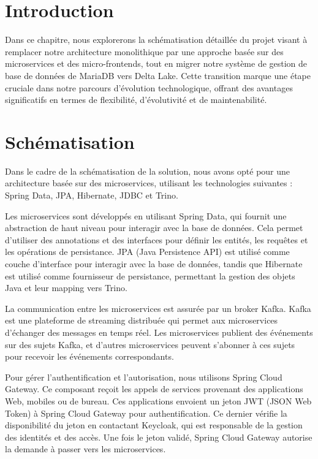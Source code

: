 \section*{Introduction}

Dans ce chapitre, nous explorerons la schématisation détaillée du projet visant à remplacer notre architecture monolithique par une approche basée sur des microservices et des micro-frontends, tout en migrer notre système de gestion de base de données de MariaDB vers Delta Lake. Cette transition marque une étape cruciale dans notre parcours d'évolution technologique, offrant des avantages significatifs en termes de flexibilité, d'évolutivité et de maintenabilité.

\section{Schématisation}

Dans le cadre de la schématisation de la solution, nous avons opté pour une architecture basée sur des microservices, utilisant les technologies suivantes : Spring Data, JPA, Hibernate, JDBC et Trino.

Les microservices sont développés en utilisant Spring Data, qui fournit une abstraction de haut niveau pour interagir avec la base de données. Cela permet d'utiliser des annotations et des interfaces pour définir les entités, les requêtes et les opérations de persistance. JPA (Java Persistence API) est utilisé comme couche d'interface pour interagir avec la base de données, tandis que Hibernate est utilisé comme fournisseur de persistance, permettant la gestion des objets Java et leur mapping vers Trino.

La communication entre les microservices est assurée par un broker Kafka. Kafka est une plateforme de streaming distribuée qui permet aux microservices d'échanger des messages en temps réel. Les microservices publient des événements sur des sujets Kafka, et d'autres microservices peuvent s'abonner à ces sujets pour recevoir les événements correspondants.

Pour gérer l'authentification et l'autorisation, nous utilisons Spring Cloud Gateway. Ce composant reçoit les appels de services provenant des applications Web, mobiles ou de bureau. Ces applications envoient un jeton JWT (JSON Web Token) à Spring Cloud Gateway pour authentification. Ce dernier vérifie la disponibilité du jeton en contactant Keycloak, qui est responsable de la gestion des identités et des accès. Une fois le jeton validé, Spring Cloud Gateway autorise la demande à passer vers les microservices.


